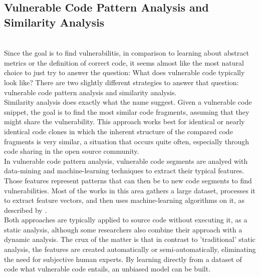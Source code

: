 \documentclass[
	a4paper,
	pagesize,
	pdftex,
	12pt,
	twoside, %
	BCOR=5mm, %
	ngerman,
	fleqn,
	final,
	]{scrartcl}
\begin{document}
\subsection{Vulnerable Code Pattern Analysis and Similarity Analysis}\mbox{}\\
Since the goal is to find vulnerabilitis, in comparison to learning about abstract metrics or the definition of correct code, it seems almost like the most natural choice to just try to answer the question: What does vulnerable code typically look like? There are two slightly different strategies to answer that question: vulnerable code pattern analysis and similarity analysis.\\
Similarity analysis does exactly what the name suggest. Given a vulnerable code snippet, the goal is to find the most similar code fragments, assuming that they might share the vulnerability. This approach works best for identical or nearly identical code clones in which the inherent structure of the compared code fragments is very similar\cite{Li.2018}, a situation that occurs quite often, especially through code sharing in the open source community.\\
In vulnerable code pattern analysis, vulnerable code segments are analyed with data-mining and machine-learning techniques to extract their typical features. Those features represent patterns that can then be to new code segments to find vulnerabilities. Most of the works in this area gathers a large dataset, processes it to extract feature vectors, and then uses machine-learning algorithms on it, as described by \citep{Ghaffarian.2017}.\\
Both approaches are typically applied to source code without executing it, as a static analysis, although some researchers also combine their approach with a dynamic analysis. The crux of the matter is that in contrast to 'traditional' static analysis, the features are created automatically or semi-automatically, eliminating the need for subjective human experts. By learning directly from a dataset of code what vulnerable code entails, an unbiased model can be built.\\
\end{document}
